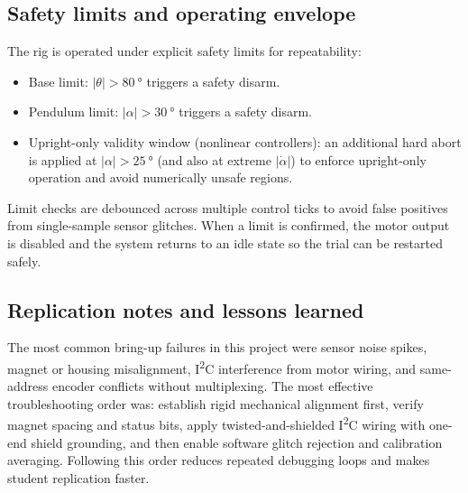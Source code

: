 \subsection{Safety limits and operating envelope}
The rig is operated under explicit safety limits for repeatability:
\begin{itemize}
  \item Base limit: $|\theta| > \SI{80}{\degree}$ triggers a safety disarm.
  \item Pendulum limit: $|\alpha| > \SI{30}{\degree}$ triggers a safety disarm.
  \item Upright-only validity window (nonlinear controllers): an additional hard abort is applied at $|\alpha|>\SI{25}{\degree}$ (and also at extreme $|\dot{\alpha}|$) to enforce upright-only operation and avoid numerically unsafe regions.
\end{itemize}

Limit checks are debounced across multiple control ticks to avoid false positives from single-sample sensor glitches. When a limit is confirmed, the motor output is disabled and the system returns to an idle state so the trial can be restarted safely.

\subsection{Replication notes and lessons learned}
\label{sec:replication_notes}
The most common bring-up failures in this project were sensor noise spikes, magnet or housing misalignment, I\textsuperscript{2}C interference from motor wiring, and same-address encoder conflicts without multiplexing. The most effective troubleshooting order was: establish rigid mechanical alignment first, verify magnet spacing and status bits, apply twisted-and-shielded I\textsuperscript{2}C wiring with one-end shield grounding, and then enable software glitch rejection and calibration averaging. Following this order reduces repeated debugging loops and makes student replication faster.
